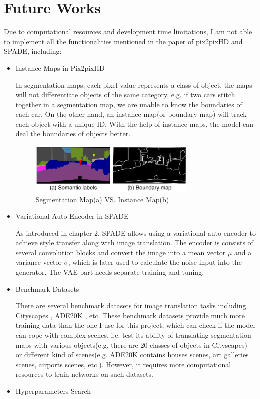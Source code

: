 \section{Future Works}
\label{sec:future work}
Due to computational resources and development time limitations, I am not able 
to implement all the functionalities mentioned in the paper of pix2pixHD\cite{wang2018pix2pixHD}
and SPADE\cite{park2019SPADE}, including:
\begin{itemize}
    \item Instance Maps in Pix2pixHD
    
    In segmentation maps, each pixel value represents a class of object, the maps will not 
    differentiate objects of the same category, e.g. if two cars stitch together in a 
    segmentation map, we are unable to know the boundaries of each car. On the other hand, 
    an instance map(or boundary map) will track each object with a unique ID. With the help 
    of instance maps, the model can deal the boundaries of objects better.
    \begin{figure}[H]
        \begin{center}
        \includegraphics[width=8cm]{figures/instance-map}
        \end{center}
        \caption{Segmentation Map(a) VS. Instance Map(b)}
        \label{fig:instance-map}
    \end{figure}
    \item Variational Auto Encoder in SPADE
    
    As introduced in chapter 2, SPADE allows using a variational auto encoder to achieve 
    style transfer along with image translation. The encoder is consists of several 
    convolution blocks and convert the image into a mean vector $\mu$ and a variance vector
    $\sigma$, which is later used to calculate the noise input into the generator. 
    The VAE part needs separate training and tuning.
    \item Benchmark Datasets
    
    \nocite{zhou2016semantic}
    There are several benchmark datasets for image translation tasks including 
    Cityscapes \cite{Cordts2016Cityscapes}, ADE20K \cite{zhou2017scene}, etc. These 
    benchmark datasets provide much more training data than the one I use for 
    this project, which can check if the model can cope with complex scenes, i.e. test its ability of 
    translating segmentation maps with various objects(e.g. there are 20 classes of objects in Cityscapes) 
    or different kind of scenes(e.g. ADE20K contains houses scenes, art galleries scenes, airports 
    scenes, etc.). 
    However, it requires more computational resources to train networks on such 
    datasets.
    \item Hyperparameters Search
    

\end{itemize}
